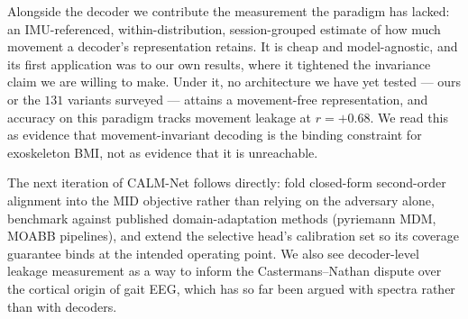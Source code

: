 \documentclass[journal]{IEEEtran}
\begin{document}
Alongside the decoder we contribute the measurement the paradigm has lacked: an
IMU-referenced, within-distribution, session-grouped estimate of how much movement a
decoder's representation retains. It is cheap and model-agnostic, and its first
application was to our own results, where it tightened the invariance claim we are
willing to make. Under it, no architecture we have yet tested --- ours or the $131$
variants surveyed --- attains a movement-free representation, and accuracy on this
paradigm tracks movement leakage at $r = +0.68$. We read this as evidence that
movement-invariant decoding is the binding constraint for exoskeleton BMI, not as
evidence that it is unreachable.

The next iteration of CALM-Net follows directly: fold closed-form second-order alignment
into the MID objective rather than relying on the adversary alone, benchmark against
published domain-adaptation methods (pyriemann MDM, MOABB pipelines), and extend the
selective head's calibration set so its coverage guarantee binds at the intended
operating point. We also see decoder-level leakage measurement as a way to inform the
Castermans--Nathan dispute over the cortical origin of gait EEG, which has so far been
argued with spectra rather than with decoders.
\end{document}
